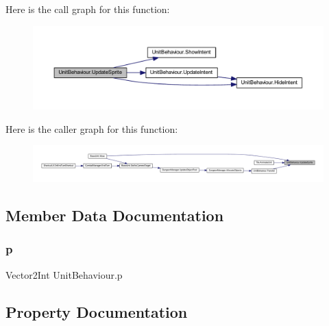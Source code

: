 Here is the call graph for this function\+:
\nopagebreak
\begin{figure}[H]
\begin{center}
\leavevmode
\includegraphics[width=350pt]{class_unit_behaviour_a559fdec9ef2c1c1a6c1a863cb868bce5_cgraph}
\end{center}
\end{figure}
Here is the caller graph for this function\+:
\nopagebreak
\begin{figure}[H]
\begin{center}
\leavevmode
\includegraphics[width=350pt]{class_unit_behaviour_a559fdec9ef2c1c1a6c1a863cb868bce5_icgraph}
\end{center}
\end{figure}


\subsection{Member Data Documentation}
\mbox{\label{class_unit_behaviour_ae1d622ff10d142433b35f6c2352b97e4}} 
\subsubsection{\texorpdfstring{p}{p}}
{\footnotesize\ttfamily Vector2\+Int Unit\+Behaviour.\+p}



\subsection{Property Documentation}
\mbox{\label{class_unit_behaviour_a05cd74b1093c4a86d9a3556af9b3dad3}} 
